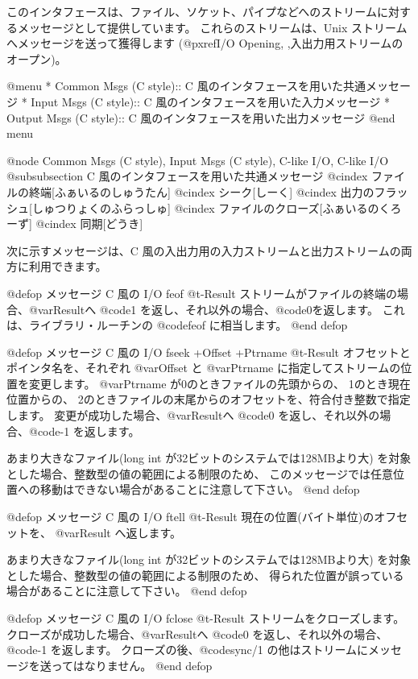 {{{{このインタフェースは、ファイル、ソケット、パイプなどへのストリームに対するメッセージとして提供しています。
これらのストリームは、Unix ストリームへメッセージを送って獲得します
(@pxref{I/O Opening, ,入出力用ストリームのオープン})。

@menu
* Common Msgs (C style)::       C 風のインタフェースを用いた共通メッセージ
* Input Msgs (C style)::        C 風のインタフェースを用いた入力メッセージ
* Output Msgs (C style)::       C 風のインタフェースを用いた出力メッセージ
@end menu

@node Common Msgs (C style), Input Msgs (C style), C-like I/O, C-like I/O
@subsubsection C 風のインタフェースを用いた共通メッセージ
@cindex ファイルの終端[ふぁいるのしゅうたん]
@cindex シーク[しーく]
@cindex 出力のフラッシュ[しゅつりょくのふらっしゅ]
@cindex ファイルのクローズ[ふぁいるのくろーず]
@cindex 同期[どうき]

次に示すメッセージは、C 風の入出力用の入力ストリームと出力ストリームの両方に利用できます。

@defop {メッセージ} {C 風の I/O }  feof @t{-}Result
ストリームがファイルの終端の場合、@var{Result}へ @code{1} を返し、それ以外の場合、@code{0}を返します。
これは、ライブラリ・ルーチンの @code{feof} に相当します。
@end defop  

@defop {メッセージ} {C 風の I/O }  fseek +Offset +Ptrname @t{-}Result
オフセットとポインタ名を、それぞれ @var{Offset} と @var{Ptrname} に指定してストリームの位置を変更します。
@var{Ptrname} が0のときファイルの先頭からの、
1のとき現在位置からの、
2のときファイルの末尾からのオフセットを、符合付き整数で指定します。
変更が成功した場合、@var{Result}へ @code{0} を返し、それ以外の場合、@code{-1} を返します。

あまり大きなファイル(long int が32ビットのシステムでは128MBより大)
を対象とした場合、整数型の値の範囲による制限のため、
このメッセージでは任意位置への移動はできない場合があることに注意して下さい。
@end defop

@defop {メッセージ} {C 風の I/O }  ftell @t{-}Result
現在の位置(バイト単位)のオフセットを、 @var{Result} へ返します。

あまり大きなファイル(long int が32ビットのシステムでは128MBより大)
を対象とした場合、整数型の値の範囲による制限のため、
得られた位置が誤っている場合があることに注意して下さい。
@end defop

@defop {メッセージ} {C 風の I/O }  fclose @t{-}Result
ストリームをクローズします。
クローズが成功した場合、@var{Result}へ @code{0} を返し、それ以外の場合、@code{-1} を返します。
クローズの後、@code{sync/1} の他はストリームにメッセージを送ってはなりません。
@end defop

}}}}
